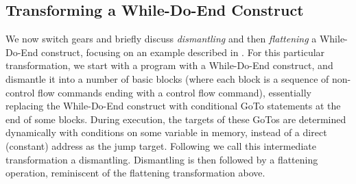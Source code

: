 \documentclass[compsoc,conference,a4paper,10pt,times]{IEEEtran}
\begin{document}
\subsection{Transforming a While-Do-End Construct}\label{4.4}
We now switch gears and briefly discuss \emph{dismantling} and then \emph{flattening} a While-Do-End construct, focusing on an example described in \cite{Wang}.
For this particular transformation, we start with a program with a While-Do-End construct, and dismantle it into a number of basic blocks (where each block is a sequence of non-control flow commands ending with a control flow command), essentially replacing the While-Do-End construct with conditional GoTo statements at the end of some blocks.  During execution, the targets of these GoTos are determined dynamically with conditions on some variable in memory, instead of a direct (constant) address as the jump target. Following \cite{Wang} we call this intermediate transformation a dismantling.
Dismantling is then followed by a flattening operation, reminiscent of the flattening transformation above.



\end{document}
